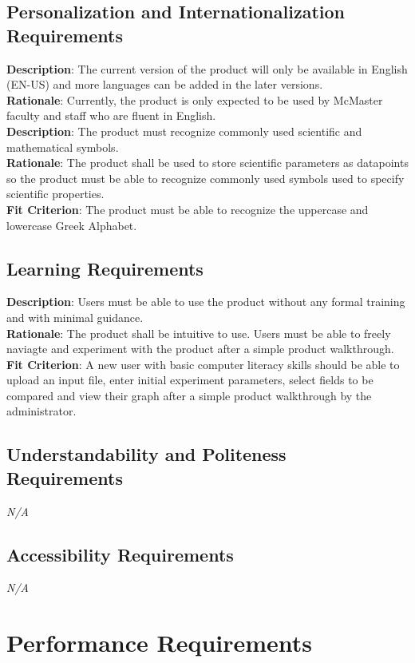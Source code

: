\documentclass[12pt]{article}
\begin{document}
\subsection{Personalization and Internationalization Requirements}
\textbf{Description}: The current version of the product will only be available
in English (EN-US) and more languages can be added in the later versions.\\
\textbf{Rationale}: Currently, the product is only expected to be used by
McMaster faculty and staff who are fluent in English.\\
\newline
\textbf{Description}: The product must recognize commonly used scientific and
mathematical symbols.\\
\textbf{Rationale}: The product shall be used to store scientific parameters as
datapoints so the product must be able to recognize commonly used symbols used
to specify scientific properties.\\
\textbf{Fit Criterion}: The product must be able to recognize the uppercase and
lowercase Greek Alphabet.

\subsection{Learning Requirements}
\textbf{Description}: Users must be able to use the product without any formal
training and with minimal guidance.\\
\textbf{Rationale}: The product shall be intuitive to use. Users must be able to
freely naviagte and experiment with the product after a simple product
walkthrough.\\
\textbf{Fit Criterion}: A new user with basic computer literacy skills should be
able to upload an input file, enter initial experiment parameters, select fields
to be compared and view their graph after a simple product walkthrough by the
administrator.

\subsection{Understandability and Politeness Requirements}
\emph{N/A}

\subsection{Accessibility Requirements}
\emph{N/A}

\section{Performance Requirements}
\end{document}
